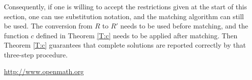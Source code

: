 \documentclass{article}
\begin{document}
Consequently, if one is willing to accept the restrictions given at the start of this section, one can use substitution notation, and the matching algorithm can still be used.  The conversion from $R$ to $R'$ needs to be used before matching, and the function $c$ defined in Theorem \ref{T:c} needs to be applied after matching.  Then Theorem \ref{T:c} guarantees that complete solutions are reported correctly by that three-step procedure.

\begin{thebibliography}{1}

 \url{http://www.openmath.org}

\end{thebibliography}
\end{document}

